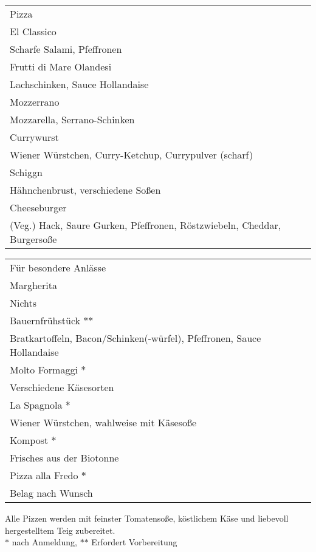 \documentclass[12pt]{article}
\makeatletter
\newcommand*\ColText[1]{\textcolor{Goldenrod3}{#1}}
\newenvironment{Group}[1]
  {\noindent\begin{tabular*}{\textwidth}{@{}p{\linewidth}@{\extracolsep{\fill}}r@{}}
    {\fontsize{24}{29}\selectfont\ColText{#1}}\\[0.8em]}
  {\end{tabular*}}
\newcommand*\Entry[2]{%
  \sffamily#1 & #2}
\newcommand*\Expl[1]{%
  \hspace*{1em}\footnotesize #1\vspace*{5pt}}
\newcommand*\FooterOne[0]{%
\vfill
\noindent \small Alle Pizzen werden mit feinster Tomatensoße, köstlichem Käse und liebe\-voll hergestelltem  Teig zubereitet.\\
$\ast$ nach Anmeldung, $\ast$$\ast$ Erfordert Vorbereitung}
\makeatother
\begin{document}
\vspace{1em}

\begin{Group}{Pizza}
\Entry{El Classico}{} \\
\Expl{Scharfe Salami, Pfeffronen} \\
\Entry{Frutti di Mare Olandesi}{} \\
\Expl{Lachschinken, Sauce Hollandaise} \\
\Entry{Mozzerrano}{} \\
\Expl{Mozzarella, Serrano-Schinken} \\
\Entry{Currywurst} \\
\Expl{Wiener Würstchen, Curry-Ketchup, Currypulver (scharf)} \\
\Entry{Schiggn}{} \\
\Expl{Hähnchenbrust, verschiedene Soßen} \\
\Entry{Cheeseburger}{} \\
\Expl{(Veg.) Hack, Saure Gurken, Pfeffronen, Röstzwiebeln, Cheddar, Burgersoße} \\
\end{Group}

\vspace{1em}

\begin{Group}{Für besondere Anlässe}
\Entry{Margherita}{} \\ 
\Expl{Nichts} \\
\Entry{Bauernfrühstück $\ast$$\ast$}{} \\
\Expl{Bratkartoffeln, Bacon/Schinken(-würfel), Pfeffronen, Sauce Hollandaise} \\
\Entry{Molto Formaggi $\ast$}{} \\ 
\Expl{Verschiedene Käsesorten} \\
\Entry{La Spagnola $\ast$}{} \\
\Expl{Wiener Würstchen, wahlweise mit Käsesoße} \\
\Entry{Kompost $\ast$}{} \\ 
\Expl{Frisches aus der Biotonne} \\
\Entry{Pizza alla Fredo $\ast$}{} \\
\Expl{Belag nach Wunsch} \\
\end{Group}

\vspace{1em}

\FooterOne
\end{document}
